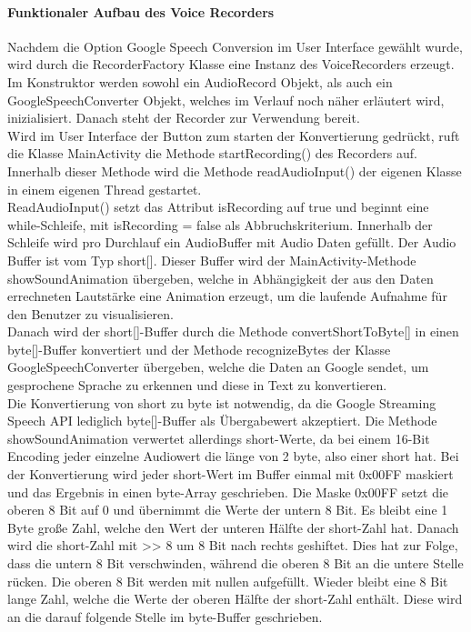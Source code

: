 \paragraph{Funktionaler Aufbau des Voice Recorders}
Nachdem die Option Google Speech Conversion im User Interface gewählt wurde, wird durch die RecorderFactory Klasse eine Instanz des VoiceRecorders erzeugt. Im Konstruktor werden sowohl ein AudioRecord Objekt, als auch ein GoogleSpeechConverter Objekt, welches im Verlauf noch näher erläutert wird, inizialisiert. Danach steht der Recorder zur Verwendung bereit. \\
Wird im User Interface der Button zum starten der Konvertierung gedrückt, ruft die Klasse MainActivity die Methode startRecording() des Recorders auf. Innerhalb dieser Methode wird die Methode readAudioInput() der eigenen Klasse in einem eigenen Thread gestartet.\\
ReadAudioInput() setzt das Attribut isRecording auf true und beginnt eine while-Schleife, mit isRecording = false als Abbruchskriterium. Innerhalb der Schleife wird pro Durchlauf ein AudioBuffer mit Audio Daten gefüllt. Der Audio Buffer ist vom Typ short[]. Dieser Buffer wird der MainActivity-Methode showSoundAnimation übergeben, welche in Abhängigkeit der aus den Daten errechneten Lautstärke eine Animation erzeugt, um die laufende Aufnahme für den Benutzer zu visualisieren.\\
Danach wird  der short[]-Buffer durch die Methode convertShortToByte[] in einen byte[]-Buffer konvertiert und der Methode recognizeBytes der Klasse GoogleSpeechConverter übergeben, welche die Daten an Google sendet, um gesprochene Sprache zu erkennen und diese in Text zu konvertieren.\\
Die Konvertierung von short zu byte ist notwendig, da die Google Streaming Speech API lediglich byte[]-Buffer als Übergabewert akzeptiert. Die Methode showSoundAnimation verwertet allerdings short-Werte, da bei einem 16-Bit Encoding jeder einzelne Audiowert die länge von 2 byte, also einer short hat. Bei der Konvertierung wird jeder short-Wert im Buffer einmal mit 0x00FF maskiert  und das Ergebnis in einen byte-Array geschrieben. Die Maske 0x00FF setzt die oberen 8 Bit auf 0 und übernimmt die Werte der untern 8 Bit. Es bleibt eine 1 Byte große Zahl, welche den Wert der unteren Hälfte der short-Zahl hat. Danach wird die short-Zahl mit >> 8 um 8 Bit nach rechts geshiftet. Dies hat zur Folge, dass die untern 8 Bit verschwinden, während die oberen 8 Bit an die untere Stelle rücken. Die oberen 8 Bit werden mit nullen aufgefüllt. Wieder bleibt eine 8 Bit lange Zahl, welche die Werte der oberen Hälfte der short-Zahl enthält. Diese wird an die darauf folgende Stelle im byte-Buffer geschrieben.\\
